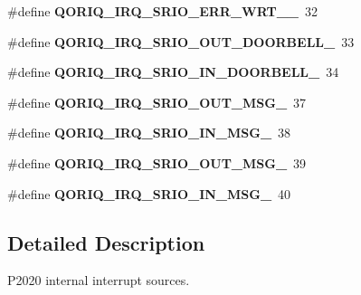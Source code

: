 \begin{DoxyCompactItemize}
\#define {\bfseries Q\+O\+R\+I\+Q\+\_\+\+I\+R\+Q\+\_\+\+S\+R\+I\+O\+\_\+\+E\+R\+R\+\_\+\+W\+R\+T\+\_\+\_}~32
\item 
\mbox{\label{group__QoriqInterruptP2020_ga2c54d46cc17e2e93d7b21fada2dccd4f}} 
\#define {\bfseries Q\+O\+R\+I\+Q\+\_\+\+I\+R\+Q\+\_\+\+S\+R\+I\+O\+\_\+\+O\+U\+T\+\_\+\+D\+O\+O\+R\+B\+E\+L\+L\+\_}~33
\item 
\mbox{\label{group__QoriqInterruptP2020_gaa982250ad3fc7c6286f966a019a84e7d}} 
\#define {\bfseries Q\+O\+R\+I\+Q\+\_\+\+I\+R\+Q\+\_\+\+S\+R\+I\+O\+\_\+\+I\+N\+\_\+\+D\+O\+O\+R\+B\+E\+L\+L\+\_}~34
\item 
\mbox{\label{group__QoriqInterruptP2020_ga82d80128f72cceae1829fcfac22fa5ae}} 
\#define {\bfseries Q\+O\+R\+I\+Q\+\_\+\+I\+R\+Q\+\_\+\+S\+R\+I\+O\+\_\+\+O\+U\+T\+\_\+\+M\+S\+G\+\_}~37
\item 
\mbox{\label{group__QoriqInterruptP2020_gab31c55d1ca4b0b8bb1654784b67daa38}} 
\#define {\bfseries Q\+O\+R\+I\+Q\+\_\+\+I\+R\+Q\+\_\+\+S\+R\+I\+O\+\_\+\+I\+N\+\_\+\+M\+S\+G\+\_}~38
\item 
\mbox{\label{group__QoriqInterruptP2020_ga89f4c3c789c16372711e45fcc7ca9042}} 
\#define {\bfseries Q\+O\+R\+I\+Q\+\_\+\+I\+R\+Q\+\_\+\+S\+R\+I\+O\+\_\+\+O\+U\+T\+\_\+\+M\+S\+G\+\_}~39
\item 
\mbox{\label{group__QoriqInterruptP2020_ga5e05f47fd32eaa1054de0f44b0ce7ee6}} 
\#define {\bfseries Q\+O\+R\+I\+Q\+\_\+\+I\+R\+Q\+\_\+\+S\+R\+I\+O\+\_\+\+I\+N\+\_\+\+M\+S\+G\+\_}~40
\end{DoxyCompactItemize}


\subsection{Detailed Description}
P2020 internal interrupt sources. 

